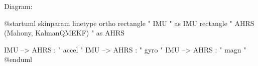 \documentclass[11pt,letterpaper]{article}
\begin{document}
Diagram:

\begin{plantuml}
@startuml
skinparam linetype ortho
rectangle "                         IMU                          " as IMU
rectangle "                                                      AHRS (Mahony, KalmanQMEKF)                                                     " as AHRS

IMU --> AHRS : " accel "
IMU --> AHRS : " gyro "
IMU --> AHRS : " magn "
@enduml
\end{plantuml}
\end{document}
